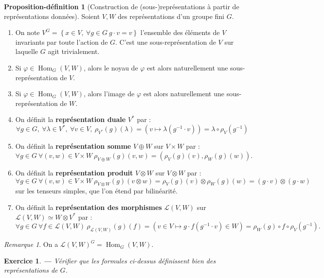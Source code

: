 \documentclass[a4paper]{article}
\newcounter{question}
\newtheorem{enonce}{Exercice}
\newenvironment{exo}[0]{\begin{enonce}{\bf ---}\rm\setcounter{question}{1}}{\end{enonce}}
\theoremstyle{definition} %
\newtheorem{Def,Prop}[Def]{Proposition-définition} %
\theoremstyle{plain} %
\theoremstyle{remark} %
\newtheorem{Rq}[Def]{Remarque} %
\begin{document}
\begin{Def,Prop}[Construction de (sous-)représentations à partir de représentations données]
Soient $V, W$ des représentations d'un groupe fini $G$.
\begin{enumerate}
 	\item On note $V^G = \left\{x \in V,\ \forall g\in G\ g \cdot v = v \right\}$ l'ensemble des éléments de $V$ invariants par toute l'action de $G$. C'est une sous-représentation de $V$ sur laquelle $G$ agit trivialement.
 	\item Si $\varphi \in \operatorname{Hom}_G(V,W)$, alors le noyau de $\varphi$ est alors naturellement une sous-représentation de $V$.
 	\item Si $\varphi \in \operatorname{Hom}_G(V,W)$, alors l'image de $\varphi$ est alors naturellement une sous-représentation de $W$.
	\item On définit la \textbf{représentation duale} $V^*$ par :
	 	$$\forall g \in G,\ \forall \lambda \in V^*,\ \forall v \in V,\ \rho_{V^*}(g)(\lambda) = \left(v \mapsto \lambda\left(g^{-1} \cdot v\right) \right) = \lambda \circ \rho_V\left(g^{-1}\right)$$
 	\item On définit la \textbf{représentation somme} $V \oplus W$ sur $V \times W$ par :
 	$$\forall g\in G\ \forall (v,w) \in V \times W\ \rho_{V\oplus W}(g)(v,w) = \left(\rho_V(g)(v),\rho_W(g)(w)\right).$$
 	\item On définit la \textbf{représentation produit} $V \otimes W$ sur $V \otimes W$ par :
 	$$\forall g\in G\ \forall (v,w) \in V \times W\ \rho_{V\otimes W}(g)(v\otimes w) = \rho_V(g)(v)\otimes \rho_W(g)(w) = (g \cdot v) \otimes (g \cdot w)$$
 	sur les tenseurs simples, que l'on étend par bilinéarité.
 	\item On définit la \textbf{représentation des morphismes} $\mathcal{L}(V,W)$ sur $\mathcal{L}(V,W) \simeq W \otimes V^*$ par :
 	$$\forall g\in G\ \forall f \in \mathcal{L}(V,W)\ \rho_{\mathcal{L}(V,W)}(g)(f) = \left(v \in V \mapsto g \cdot f \left( g^{-1} \cdot v\right) \in W\right) = \rho_W(g) \circ f \circ \rho_V(g^{-1}).$$
\end{enumerate}
\end{Def,Prop}

\begin{Rq}
On a $\mathcal{L}(V,W)^G = \operatorname{Hom}_G(V,W)$.
\end{Rq}

\begin{exo}
	Vérifier que les formules ci-dessus définissent bien des représentations de $G$.
\end{exo}
 
\end{document}
